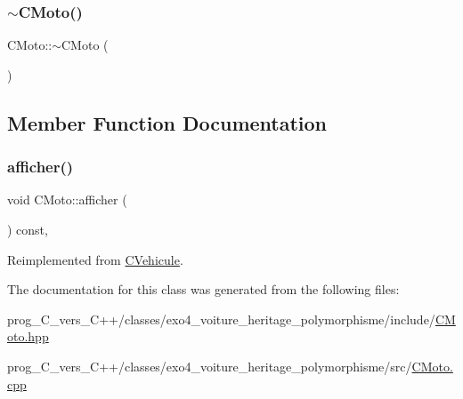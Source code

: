 \subsubsection{\texorpdfstring{$\sim$\+C\+Moto()}{~CMoto()}}
{\footnotesize\ttfamily C\+Moto\+::$\sim$\+C\+Moto (\begin{DoxyParamCaption}{ }\end{DoxyParamCaption})\hspace{0.3cm}{\ttfamily [virtual]}}



\subsection{Member Function Documentation}
\mbox{\label{classCMoto_a37389934d10714c39386335eb31381e1}} 
\subsubsection{\texorpdfstring{afficher()}{afficher()}}
{\footnotesize\ttfamily void C\+Moto\+::afficher (\begin{DoxyParamCaption}{ }\end{DoxyParamCaption}) const\hspace{0.3cm}{\ttfamily [override]}, {\ttfamily [virtual]}}



Reimplemented from \hyperlink{classCVehicule_a7d62fa555949feb096b4f56781164895}{C\+Vehicule}.



The documentation for this class was generated from the following files\+:\begin{DoxyCompactItemize}
\item 
prog\+\_\+\+C\+\_\+vers\+\_\+\+C++/classes/exo4\+\_\+voiture\+\_\+heritage\+\_\+polymorphisme/include/\hyperlink{CMoto_8hpp}{C\+Moto.\+hpp}\item 
prog\+\_\+\+C\+\_\+vers\+\_\+\+C++/classes/exo4\+\_\+voiture\+\_\+heritage\+\_\+polymorphisme/src/\hyperlink{CMoto_8cpp}{C\+Moto.\+cpp}\end{DoxyCompactItemize}
